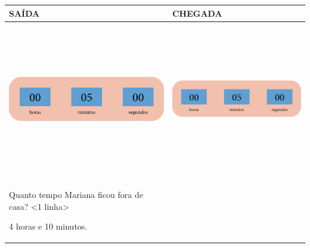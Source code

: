 \begin{longtable}[]{@{}ll@{}}
\toprule
SAÍDA & CHEGADA\tabularnewline
\midrule
\endhead
\includegraphics[width=2.71875in,height=2.65625in]{media/image61.png} &
\includegraphics[width=2.71875in,height=2.65625in]{media/image61.png}\tabularnewline
\begin{minipage}[t]{0.48\columnwidth}\raggedright\strut
Quanto tempo Mariana ficou fora de casa? \textless{}1
linha\textgreater{}

4 horas e 10 minutos.\strut
\end{minipage}\tabularnewline
\bottomrule
\end{longtable}


